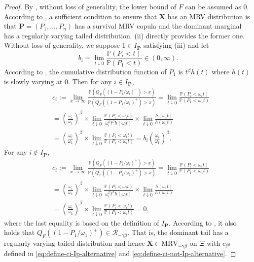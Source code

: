 \documentclass[12pt]{article}
\theoremstyle{plain}
\theoremstyle{plain}
\theoremstyle{definition}
\renewcommand{\Pr}{\mathbb{P}}
\begin{document}
\PowerIncrease*
\begin{proof}
By , without loss of generality, the lower bound of $F$ can be assumed as 0.
According to , a sufficient condition to ensure that ${\mathbf{X}}$ has an MRV distribution is that $\mathbf{P}=(P_1,\dots,P_n)$ has a survival MRV copula and the dominant marginal has a regularly varying tailed distribution.  (ii) directly provides the former one. 
Without loss of generality, we suppose $1\in I_{\mathbf{P}}$ satisfying  (iii) and let
\[
b_i=\lim_{t\downarrow0}\frac{\Pr(P_i<t)}{\Pr(P_1<t)}\in(0,\infty).
\]
According to , the cumulative distribution function of $P_1$ is $t^\beta h(t)$ where $h(t)$ is slowly varying at $0$.
Then for any $i\in I_{\mathbf{P}}$,
\begin{equation}
\label{eq:define-ci-Ip-alternative}
\begin{split}
&c_i:=\lim_{x\to\infty}\frac{\Pr(Q_F\left((1-P_i/\omega_i)^+\right)>x)}{\Pr(Q_F\left((1-P_1/\omega_1)^+\right)>x)}
=\lim_{t\downarrow0}\frac{\Pr(P_i<\omega_i t)}{\Pr(P_1<\omega_1 t)}\\
&=\left(\frac{\omega_i}{\omega_1}\right)^\beta\times\lim_{t\downarrow0}\frac{\Pr(P_i<\omega_i t)}{\omega_i^\beta t^\beta h(\omega_i t)}\times\lim_{t\downarrow0}\frac{h(\omega_i t)}{h(\omega_1 t)}
\\
&=\left(\frac{\omega_i}{\omega_1}\right)^\beta\times\lim_{t\downarrow0}\frac{\Pr(P_i<\omega_i t)}{\Pr(P_1<\omega_i t)}
=b_i\left(\frac{\omega_i}{\omega_1}\right)^\beta.    
\end{split}
\end{equation}
For any $i\notin I_{\mathbf{P}}$,
\begin{equation}
\label{eq:define-ci-not-Ip-alternative}
\begin{split}
&c_i:=\lim_{x\to\infty}\frac{\Pr(Q_F\left((1-P_i/\omega_i)^+\right)>x)}{\Pr(Q_F\left((1-P_1/\omega_1)^+\right)>x)}
=\lim_{t\downarrow0}\frac{\Pr(P_i<\omega_i t)}{\Pr(P_1<\omega_1 t)}\\
&=\left(\frac{\omega_i}{\omega_1}\right)^\beta\times\lim_{t\downarrow0}\frac{\Pr(P_i<\omega_i t)}{\omega_i^\beta t^\beta h(\omega_i t)}\times\lim_{t\downarrow0}\frac{h(\omega_i t)}{h(\omega_1 t)}
\\
&=\left(\frac{\omega_i}{\omega_1}\right)^\beta\times\lim_{t\downarrow0}\frac{\Pr(P_i<\omega_i t)}{\Pr(P_1<\omega_i t)}
=0,
\end{split}
\end{equation}
where the last equality is based on the definition of $I_{\mathbf{P}}$.
According to , it also holds that $Q_{F}((1-P_1/\omega_1)^+)\in\mathscr{R}_{-\gamma\beta}$. That is, the dominant tail has a regularly varying tailed distribution and hence ${\mathbf{X}}\in\mathrm{MRV}_{-\gamma\beta}$ on $\Xi$ with $c_i$s defined in \eqref{eq:define-ci-Ip-alternative} and \eqref{eq:define-ci-not-Ip-alternative}.


\end{proof}
\end{document}
